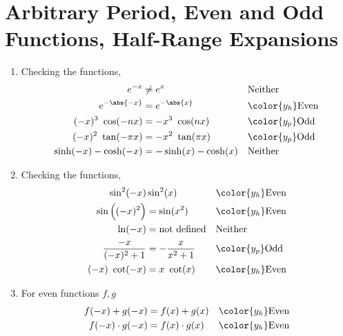 \section{Arbitrary Period, Even and Odd Functions, Half-Range Expansions}

\begin{enumerate}
    \item Checking the functions,
          \begin{align}
              e^{-x}                & \neq e^{x}              &
                                    & \text{Neither}            \\
              e^{-\abs{-x}}         & = e^{-\abs{x}}          &
                                    & \color{y_h} \text{Even}   \\
              (-x)^3\ \cos(-nx)     & = -x^3\ \cos(nx)        &
                                    & \color{y_p} \text{Odd}    \\
              (-x)^2\ \tan(-\pi x)  & = -x^2\ \tan(\pi x)     &
                                    & \color{y_p} \text{Odd}    \\
              \sinh(-x) - \cosh(-x) & = -\sinh(x) - \cosh(x)  &
                                    & \text{Neither}
          \end{align}

    \item Checking the functions,
          \begin{align}
              \sin^2(-x)            & \sin^2(x)               &
                                    & \color{y_h} \text{Even}   \\
              \sin\Big((-x)^2\Big)  & = \sin(x^2)             &
                                    & \color{y_h} \text{Even}   \\
              \ln(-x)               & = \text{not defined}    &
                                    & \text{Neither}            \\
              \frac{-x}{(-x)^2 + 1} & = -\frac{x}{x^2 + 1}    &
                                    & \color{y_p} \text{Odd}    \\
              (-x)\ \cot(-x)        & = x\ \cot(x)            &
                                    & \color{y_h} \text{Even}
          \end{align}

    \item For even functions $ f, g $
          \begin{align}
              f(-x) + g(-x)     & = f(x) + g(x)           &
                                & \color{y_h} \text{Even}   \\
              f(-x) \cdot g(-x) & = f(x) \cdot g(x)       &
                                & \color{y_h} \text{Even}
          \end{align}


\end{enumerate}
